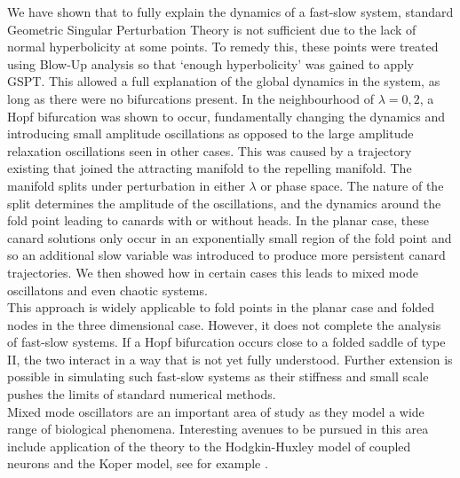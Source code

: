 We have shown that to fully explain the dynamics of a fast-slow system, standard
Geometric Singular Perturbation Theory is not sufficient due to the lack of
normal hyperbolicity at some points. To remedy this, these points were treated using Blow-Up analysis
so that `enough hyperbolicity' was gained to apply GSPT. This allowed a full
explanation of the global dynamics in the system, as long as there were no
bifurcations present. In the neighbourhood of $\lambda=0,2$, a Hopf bifurcation
was shown to occur, fundamentally changing the dynamics and introducing small
amplitude oscillations as opposed to the large amplitude relaxation oscillations
seen in other cases. This was caused by a trajectory existing that joined the
attracting manifold to the repelling manifold. The manifold splits under perturbation in either $\lambda$ or phase space. The nature of the split determines the amplitude of the oscillations, and the dynamics around the fold point leading to canards with or without heads. In the planar case, these canard solutions only occur in an
exponentially small region of the fold point and so an additional slow variable was
introduced to produce more persistent canard trajectories. We then showed how in
certain cases this leads to mixed mode oscillatons and even chaotic systems. \\

This approach is widely applicable to fold points in the planar case and folded
nodes in the three dimensional case. However, it does not complete the analysis
of fast-slow systems. If a Hopf bifurcation occurs close to a folded saddle of type II,
the two interact in a way that is not yet fully understood. Further extension is
possible in simulating such fast-slow systems as their stiffness and small scale
pushes the limits of standard numerical methods. \\  

Mixed mode oscillators are an important area of study as they model a wide range
of biological phenomena. Interesting avenues to be pursued in this area include application of the theory to
the Hodgkin-Huxley model of coupled neurons and the Koper model, see for example \cite{MMO}.
